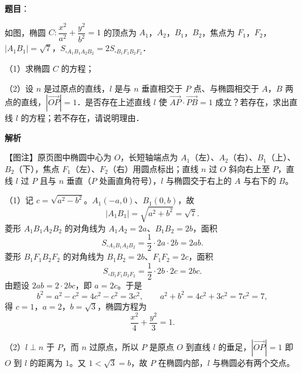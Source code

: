 \begin{answer}

\end{answer}
\begin{answer}

\textbf{题目}：

如图，椭圆 $C:\dfrac{x^2}{a^2}+\dfrac{y^2}{b^2}=1$ 的顶点为 $A_1$，$A_2$，$B_1$，$B_2$，焦点为 $F_1$，$F_2$，$|A_1B_1|=\sqrt7$，$S_{\square A_1B_1A_2B_2}=2S_{\square B_1F_1B_2F_2}$．

（1）求椭圆 $C$ 的方程；

（2）设 $n$ 是过原点的直线，$l$ 是与 $n$ 垂直相交于 $P$ 点、与椭圆相交于 $A$，$B$ 两点的直线，$|\overrightarrow{OP}|=1$．是否存在上述直线 $l$ 使 $\overrightarrow{AP}\cdot\overrightarrow{PB}=1$ 成立？若存在，求出直线 $l$ 的方程；若不存在，请说明理由．
\nopagebreak[4]
\begin{center}\end{center}
\nopagebreak[4]
\textbf{解析}

【图注】原页图中椭圆中心为 $O$，长短轴端点为 $A_1$（左）、$A_2$（右）、$B_1$（上）、$B_2$（下），焦点 $F_1$（左）、$F_2$（右）用圆点标出；直线 $n$ 过 $O$ 斜向右上至 $P$，直线 $l$ 过 $P$ 且与 $n$ 垂直（$P$ 处画直角符号），$l$ 与椭圆交于右上的 $A$ 与右下的 $B$。

（1）记 $c=\sqrt{a^2-b^2}$。$A_1(-a,0)$、$B_1(0,b)$，故
\nopagebreak[4]
\[|A_1B_1|=\sqrt{a^2+b^2}=\sqrt7.\]
菱形 $A_1B_1A_2B_2$ 的对角线为 $A_1A_2=2a$、$B_1B_2=2b$，面积
\nopagebreak[4]
\[S_{\square A_1B_1A_2B_2}=\frac12\cdot 2a\cdot 2b=2ab.\]
菱形 $B_1F_1B_2F_2$ 的对角线为 $B_1B_2=2b$、$F_1F_2=2c$，面积
\nopagebreak[4]
\[S_{\square B_1F_1B_2F_2}=\frac12\cdot 2b\cdot 2c=2bc.\]
由题设 $2ab=2\cdot 2bc$，即 $a=2c$。于是
\nopagebreak[4]
\[b^2=a^2-c^2=4c^2-c^2=3c^2,\qquad a^2+b^2=4c^2+3c^2=7c^2=7,\]
得 $c=1$，$a=2$，$b=\sqrt3$，椭圆方程为
\nopagebreak[4]
\[\frac{x^2}{4}+\frac{y^2}{3}=1.\]

（2）$l\perp n$ 于 $P$，而 $n$ 过原点，所以 $P$ 是原点 $O$ 到直线 $l$ 的垂足，$|\overrightarrow{OP}|=1$ 即 $O$ 到 $l$ 的距离为 $1$。又 $1<\sqrt3=b$，故 $P$ 在椭圆内部，$l$ 与椭圆必有两个交点。


\end{answer}

